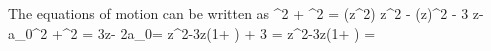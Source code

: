 The equations of motion can be written as
\be
\chidot^2 + \Gdot^2 =  \Dz(z^2\phidot)
\label{C}
\ee
\be
\thalf {} z^2 \phiddot - \tthalf (z\phidot)^2 - 3  z\phi - a_0\phi^2 +\tthalf\chi^2
=  
\label{U}
\ee
\be
3z\phidot - 2a_0\phi = 
\label{phi}
\ee
\be
z^2\chiddot -3z\chidot \left(1+ \right) + 3\chi
= 
\label{chi}
\ee
\be
z^2\Gddot -3z\Gdot \left(1+ \right)
= 
\label{G}
\ee


